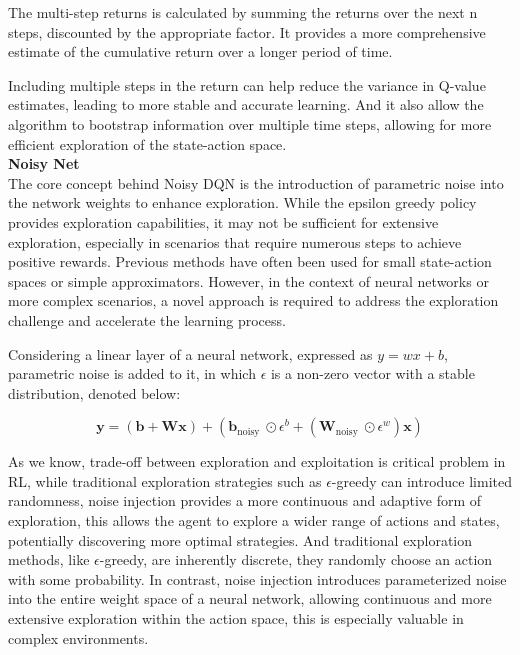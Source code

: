 \documentclass{article}
\begin{document}
The multi-step returns is calculated by summing the returns over the next n steps, discounted by the appropriate factor. It provides a more comprehensive estimate of the cumulative return over a longer period of time.

Including multiple steps in the return can help reduce the variance in Q-value estimates, leading to more stable and accurate learning. And it also allow the algorithm to bootstrap information over multiple time steps, allowing for more efficient exploration of the state-action space.\\


\noindent
\textbf{Noisy Net}\\
\noindent
The core concept behind Noisy DQN is the introduction of parametric noise into the network weights to enhance exploration. While the epsilon greedy policy provides exploration capabilities, it may not be sufficient for extensive exploration, especially in scenarios that require numerous steps to achieve positive rewards. Previous methods have often been used for small state-action spaces or simple approximators. However, in the context of neural networks or more complex scenarios, a novel approach is required to address the exploration challenge and accelerate the learning process.

Considering a linear layer of a neural network, expressed as $y=wx+b$, parametric noise is added to it, in which $\epsilon$ is a non-zero vector with a stable distribution, denoted below:


\begin{equation}
\boldsymbol{y}=(\boldsymbol{b}+\mathbf{W} \boldsymbol{x})+\left(\boldsymbol{b}_{\text {noisy }} \odot \epsilon^b+\left(\mathbf{W}_{\text {noisy }} \odot \epsilon^w\right) \boldsymbol{x}\right)
\end{equation}

 As we know, trade-off between exploration and exploitation is critical problem in RL, while traditional exploration strategies such as $\epsilon$-greedy can introduce limited randomness, noise injection provides a more continuous and adaptive form of exploration, this allows the agent to explore a wider range of actions and states, potentially discovering more optimal strategies. And traditional exploration methods, like $\epsilon$-greedy, are inherently discrete, they randomly choose an action with some probability. In contrast, noise injection introduces parameterized noise into the entire weight space of a neural network, allowing continuous and more extensive exploration within the action space, this is especially valuable in complex environments.
 
\end{document}
